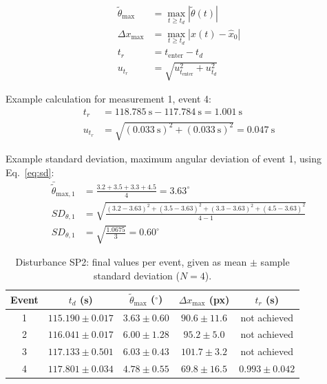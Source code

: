 \documentclass[11pt,a4paper]{article}
\begin{document}
\begin{align}
\tilde{\theta}_\text{max} &= \max_{t \ge t_d} |\tilde{\theta}(t)| \label{eq:dthmax} \\
\Delta x_\text{max} &= \max_{t \ge t_d} |x(t) - \hat{x}_0| \label{eq:dxmax} \\
t_r &= t_\text{enter} - t_d \label{eq:tr} \\
u_{t_r} &= \sqrt{u_{t_\text{enter}}^2 + u_{t_d}^2} \label{eq:utr}
\end{align}

Example calculation for measurement 1, event 4:
\begin{align*}
t_r &= 118.785~\text{s} - 117.784~\text{s} = 1.001~\text{s} \\
u_{t_r} &= \sqrt{(0.033~\text{s})^2 + (0.033~\text{s})^2} = 0.047~\text{s}
\end{align*}

Example standard deviation, maximum angular deviation of event 1, using Eq.~\eqref{eq:sd}:
\begin{align*}
\bar{\tilde{\theta}}_{\text{max},1} &= \frac{3.2 + 3.5 + 3.3 + 4.5}{4} = 3.63^\circ \\
SD_{\theta,1} &= \sqrt{\frac{(3.2-3.63)^2 + (3.5-3.63)^2 + (3.3-3.63)^2 + (4.5-3.63)^2}{4-1}} \\
SD_{\theta,1} &= \sqrt{\frac{1.0675}{3}} = 0.60^\circ
\end{align*}

\begin{table}[H]
    \centering
    \caption{Disturbance SP2: final values per event, given as mean $\pm$ sample standard deviation ($N = 4$).}
    \label{tab:dist_results}
    \renewcommand{\arraystretch}{1.6}
    \begin{tabular}{|c|c|c|c|c|}
        \hline
        \textbf{Event} & $t_d$ (s) & $\tilde{\theta}_\text{max}$ ($^\circ$) & $\Delta x_\text{max}$ (px) & $t_r$ (s) \\
        \hline
        1 & $115.190 \pm 0.017$ & $3.63 \pm 0.60$ & $90.6 \pm 11.6$  & not achieved \\ \hline
        2 & $116.041 \pm 0.017$ & $6.00 \pm 1.28$ & $95.2 \pm 5.0$   & not achieved \\ \hline
        3 & $117.133 \pm 0.501$ & $6.03 \pm 0.43$ & $101.7 \pm 3.2$  & not achieved \\ \hline
        4 & $117.801 \pm 0.034$ & $4.78 \pm 0.55$ & $69.8 \pm 16.5$  & $0.993 \pm 0.042$ \\ \hline
    \end{tabular}
\end{table}
\end{document}
